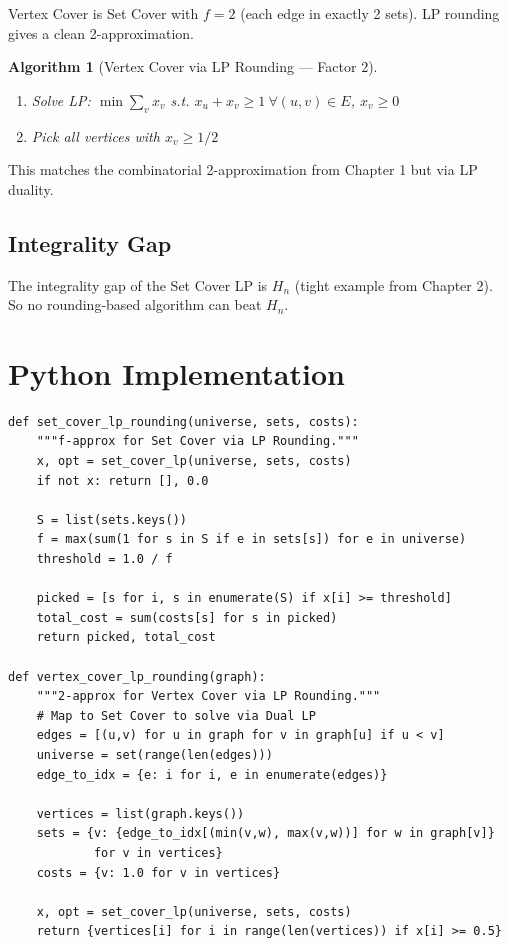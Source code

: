 \documentclass[11pt,oneside]{book}
\newtheorem{algorithmdef}[theorem]{Algorithm}
\begin{document}
Vertex Cover is Set Cover with $f=2$ (each edge in exactly 2 sets). LP rounding gives a clean 2-approximation.

\begin{algorithmdef}[Vertex Cover via LP Rounding — Factor 2]
\begin{enumerate}
    \item Solve LP: $\min \sum_v x_v$ s.t. $x_u + x_v \geq 1 \ \forall (u,v) \in E$, $x_v \geq 0$
    \item Pick all vertices with $x_v \geq 1/2$
\end{enumerate}
\end{algorithmdef}

This matches the combinatorial 2-approximation from Chapter 1 but via LP duality.

\subsection{Integrality Gap}

The integrality gap of the Set Cover LP is $H_n$ (tight example from Chapter 2). So no rounding-based algorithm can beat $H_n$.

\section{Python Implementation}

\begin{lstlisting}[style=python, caption=LP Rounding for Set Cover]
def set_cover_lp_rounding(universe, sets, costs):
    """f-approx for Set Cover via LP Rounding."""
    x, opt = set_cover_lp(universe, sets, costs)
    if not x: return [], 0.0
    
    S = list(sets.keys())
    f = max(sum(1 for s in S if e in sets[s]) for e in universe)
    threshold = 1.0 / f
    
    picked = [s for i, s in enumerate(S) if x[i] >= threshold]
    total_cost = sum(costs[s] for s in picked)
    return picked, total_cost

def vertex_cover_lp_rounding(graph):
    """2-approx for Vertex Cover via LP Rounding."""
    # Map to Set Cover to solve via Dual LP
    edges = [(u,v) for u in graph for v in graph[u] if u < v]
    universe = set(range(len(edges)))
    edge_to_idx = {e: i for i, e in enumerate(edges)}
    
    vertices = list(graph.keys())
    sets = {v: {edge_to_idx[(min(v,w), max(v,w))] for w in graph[v]} 
            for v in vertices}
    costs = {v: 1.0 for v in vertices}
    
    x, opt = set_cover_lp(universe, sets, costs)
    return {vertices[i] for i in range(len(vertices)) if x[i] >= 0.5}
\end{lstlisting}
\end{document}
